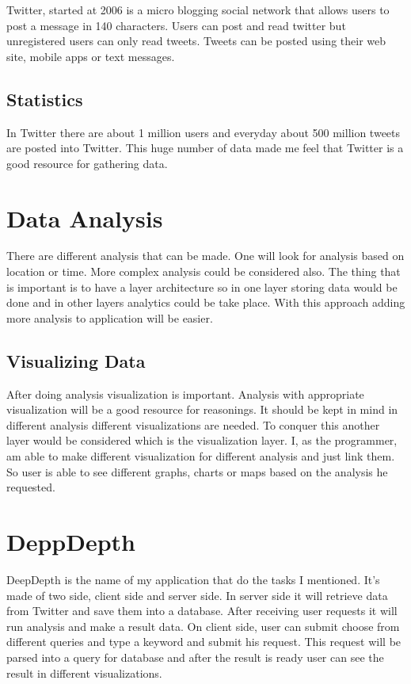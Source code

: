\documentclass[a4paper,11pt]{report}
\begin{document}
Twitter, started at 2006 is a micro blogging social network that allows users to post a message in 140 characters. Users can post and read twitter but unregistered users can only read tweets. Tweets can be posted using their web site, mobile apps or text messages.

\subsection{Statistics}

In Twitter there are about 1 million users and everyday about 500 million tweets are posted into Twitter. This huge number of data made me feel that Twitter is a good resource for gathering data.

\section{Data Analysis}

There are different analysis that can be made. One will look for analysis based on location or time. More complex analysis could be considered also. The thing that is important is to have a layer architecture so in one layer storing data would be done and in other layers analytics could be take place. With this approach adding more analysis to application will be easier.

\subsection{Visualizing Data}

After doing analysis visualization is important. Analysis with appropriate visualization will be a good resource for reasonings. It should be kept in mind in different analysis different visualizations are needed. To conquer this another layer would be considered which is the visualization layer. I, as the programmer, am able to make different visualization for different analysis and just link them. So user is able to see different graphs, charts or maps based on the analysis he requested.

\section{DeppDepth}

DeepDepth is the name of my application that do the tasks I mentioned. It's made of two side, client side and server side. In server side it will retrieve data from Twitter and save them into a database. After receiving user requests it will run analysis and make a result data. On client side, user can submit choose from different queries and type a keyword and submit his request. This request will be parsed into a query for database and after the result is ready user can see the result in different visualizations.
\end{document}
